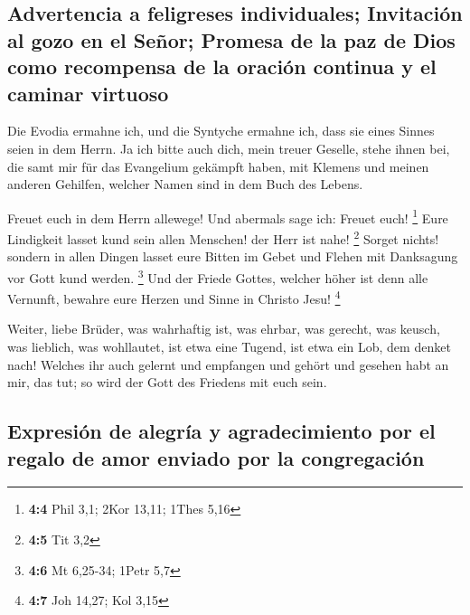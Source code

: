 \hypertarget{advertencia-a-feligreses-individuales-invitaciuxf3n-al-gozo-en-el-seuxf1or-promesa-de-la-paz-de-dios-como-recompensa-de-la-oraciuxf3n-continua-y-el-caminar-virtuoso}{%
\subsection{Advertencia a feligreses individuales; Invitación al gozo en
el Señor; Promesa de la paz de Dios como recompensa de la oración
continua y el caminar
virtuoso}\label{advertencia-a-feligreses-individuales-invitaciuxf3n-al-gozo-en-el-seuxf1or-promesa-de-la-paz-de-dios-como-recompensa-de-la-oraciuxf3n-continua-y-el-caminar-virtuoso}}

 Die Evodia ermahne ich, und die Syntyche ermahne ich,
dass sie eines Sinnes seien in dem Herrn.  Ja ich bitte
auch dich, mein treuer Geselle, stehe ihnen bei, die samt mir für das
Evangelium gekämpft haben, mit Klemens und meinen anderen Gehilfen,
welcher Namen sind in dem Buch des Lebens.

 Freuet euch in dem Herrn allewege! Und abermals sage ich:
Freuet euch! \footnote{\textbf{4:4} Phil 3,1; 2Kor 13,11; 1Thes 5,16}
 Eure Lindigkeit lasset kund sein allen Menschen! der Herr
ist nahe! \footnote{\textbf{4:5} Tit 3,2}  Sorget nichts!
sondern in allen Dingen lasset eure Bitten im Gebet und Flehen mit
Danksagung vor Gott kund werden. \footnote{\textbf{4:6} Mt 6,25-34;
  1Petr 5,7}  Und der Friede Gottes, welcher höher ist
denn alle Vernunft, bewahre eure Herzen und Sinne in Christo Jesu!
\footnote{\textbf{4:7} Joh 14,27; Kol 3,15}

 Weiter, liebe Brüder, was wahrhaftig ist, was ehrbar, was
gerecht, was keusch, was lieblich, was wohllautet, ist etwa eine Tugend,
ist etwa ein Lob, dem denket nach!  Welches ihr auch
gelernt und empfangen und gehört und gesehen habt an mir, das tut; so
wird der Gott des Friedens mit euch sein.

\hypertarget{expresiuxf3n-de-alegruxeda-y-agradecimiento-por-el-regalo-de-amor-enviado-por-la-congregaciuxf3n}{%
\subsection{Expresión de alegría y agradecimiento por el regalo de amor
enviado por la
congregación}\label{expresiuxf3n-de-alegruxeda-y-agradecimiento-por-el-regalo-de-amor-enviado-por-la-congregaciuxf3n}}

